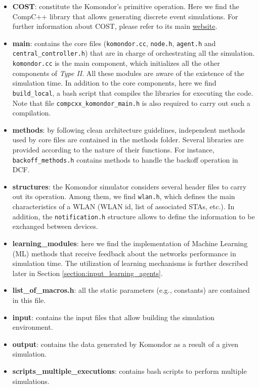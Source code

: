\documentclass[a4paper]{article}
\begin{document}
	\begin{itemize}
		\item \textbf{COST}: constitute the Komondor's primitive operation. Here we find the CompC++ library that allows generating discrete event simulations. For further information about COST, please refer to its main \href{http://www.ita.cs.rpi.edu/cost.html}{website}. 
		\item \textbf{main}: contains the core files (\texttt{komondor.cc}, \texttt{node.h}, \texttt{agent.h} and \texttt{central\_controller.h}) that are in charge of orchestrating all the simulation.  \texttt{komondor.cc} is the main component, which initializes all the other components of \textit{Type II}. All these modules are aware of the existence of the simulation time. In addition to the core components, here we find \texttt{build\_local}, a bash script that compiles the libraries for executing the code. Note that file \texttt{compcxx\_komondor\_main.h} is also required to carry out such a compilation.
		\item \textbf{methods}: by following clean architecture guidelines, independent methods used by core files are contained in the methods folder. Several libraries are provided according to the nature of their functions. For instance, \texttt{backoff\_methods.h} contains methods to handle the backoff operation in DCF.
		\item \textbf{structures}: the Komondor simulator considers several header files to carry out its operation. Among them, we find \texttt{wlan.h}, which defines the main characteristics of a WLAN (WLAN id, list of associated STAs, etc.). In addition, the \texttt{notification.h} structure allows to define the information to be exchanged between devices. 
		\item \textbf{learning\_modules}: here we find the implementation of Machine Learning (ML) methods that receive feedback about the networks performance in simulation time. The utilization of learning mechanisms is further described later in Section \ref{section:input_learning_agents}. 
		\item \textbf{list\_of\_macros.h}: all the static parameters (e.g., constants) are contained in this file.
		\item \textbf{input}: contains the input files that allow building the simulation environment.
		\item \textbf{output}: contains the data generated by Komondor as a result of a given simulation.	
		\item \textbf{scripts\_multiple\_executions}: contains bash scripts to perform multiple simulations.
	\end{itemize} 
\end{document}
